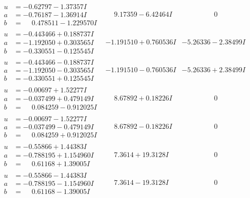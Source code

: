 \documentclass[1p]{elsarticle_modified}
\theoremstyle{definition}
\begin{document}
$$\begin{array}{c|c|c}
\begin{aligned}
u &= -0.62797 - 1.37357 I \\
a &= -0.76187 - 1.36914 I \\
b &= \phantom{-}0.478511 - 1.229570 I\end{aligned}
 & \phantom{-}9.17359 - 6.42464 I & \phantom{-0.000000 } 0 \\ \hline\begin{aligned}
u &= -0.443466 + 0.188737 I \\
a &= -1.192050 + 0.303565 I \\
b &= -0.330551 - 0.125545 I\end{aligned}
 & -1.191510 + 0.760536 I & -5.26336 - 2.38499 I \\ \hline\begin{aligned}
u &= -0.443466 - 0.188737 I \\
a &= -1.192050 - 0.303565 I \\
b &= -0.330551 + 0.125545 I\end{aligned}
 & -1.191510 - 0.760536 I & -5.26336 + 2.38499 I \\ \hline\begin{aligned}
u &= -0.00697 + 1.52277 I \\
a &= -0.037499 + 0.479149 I \\
b &= \phantom{-}0.084259 - 0.912025 I\end{aligned}
 & \phantom{-}8.67892 + 0.18226 I & \phantom{-0.000000 } 0 \\ \hline\begin{aligned}
u &= -0.00697 - 1.52277 I \\
a &= -0.037499 - 0.479149 I \\
b &= \phantom{-}0.084259 + 0.912025 I\end{aligned}
 & \phantom{-}8.67892 - 0.18226 I & \phantom{-0.000000 } 0 \\ \hline\begin{aligned}
u &= -0.55866 + 1.44383 I \\
a &= -0.788195 + 1.154960 I \\
b &= \phantom{-}0.61168 + 1.39005 I\end{aligned}
 & \phantom{-}7.3614 + 19.3128 I & \phantom{-0.000000 } 0 \\ \hline\begin{aligned}
u &= -0.55866 - 1.44383 I \\
a &= -0.788195 - 1.154960 I \\
b &= \phantom{-}0.61168 - 1.39005 I\end{aligned}
 & \phantom{-}7.3614 - 19.3128 I & \phantom{-0.000000 } 0 \\ \hline\begin{aligned}

\end{aligned}
\end{array}$$
\end{document}
